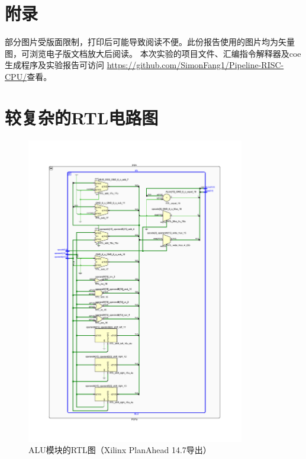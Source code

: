 \documentclass[10pt,a4paper,fleqn]{article}
\begin{document}
\section*{附录}
  \par 部分图片受版面限制，打印后可能导致阅读不便。此份报告使用的图片均为矢量图，可浏览电子版文档放大后阅读。
  本次实验的项目文件、汇编指令解释器及coe生成程序及实验报告可访问
  \url{https://github.com/SimonFang1/Pipeline-RISC-CPU/}查看。
\section{较复杂的RTL电路图}
\begin{figure}[H]
  \centering
  \includegraphics[width=0.85\textwidth]{figure/aluex.pdf}
  \caption{ALU模块的RTL图（Xilinx PlanAhead 14.7导出）}
\end{figure}
\newpage
\thispagestyle{empty}
\end{document}
